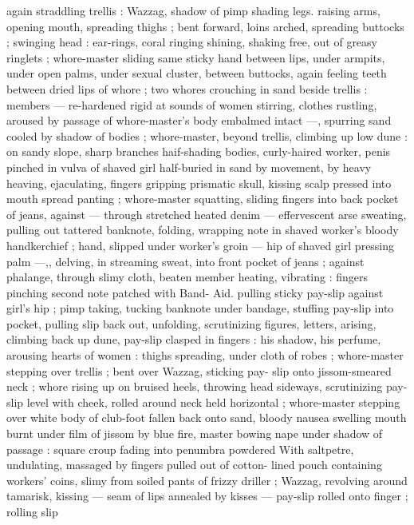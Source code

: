 {again straddling trellis : Wazzag, shadow of pimp shading legs. 
raising arms, opening mouth, spreading thighs ; bent forward, loins 
arched, spreading buttocks ; swinging head : ear-rings, coral ringing 
shining, shaking free, out of greasy ringlets ; whore-master sliding 
same sticky hand between lips, under armpits, under open palms, 
under sexual cluster, between buttocks, again feeling teeth between 
dried lips of whore ; two whores crouching in sand beside trellis : 
members --- re-hardened rigid at sounds of women stirring, clothes 
rustling, aroused by passage of whore-master's body embalmed 
intact ---, spurring sand cooled by shadow of bodies ; whore-master, 
beyond trellis, climbing up low dune : on sandy slope, sharp 
branches haif-shading bodies, curly-haired worker, penis pinched in 
vulva of shaved girl half-buried in sand by movement, by heavy 
heaving, ejaculating, fingers gripping prismatic skull, kissing scalp 
pressed into mouth spread panting ; whore-master squatting, sliding 
fingers into back pocket of jeans, against --- through stretched 
heated denim --- effervescent arse sweating, pulling out tattered 
banknote, folding, wrapping note in shaved worker's bloody 
handkerchief ; hand, slipped under worker's groin --- hip of shaved 
girl pressing palm ---,, delving, in streaming sweat, into front pocket 
of jeans ; against phalange, through slimy cloth, beaten member 
heating, vibrating : fingers pinching second note patched with Band- 
Aid. pulling sticky pay-slip against girl's hip ; pimp taking, tucking 
banknote under bandage, stuffing pay-slip into pocket, pulling slip 
back out, unfolding, scrutinizing figures, letters, arising, climbing 
back up dune, pay-slip clasped in fingers : his shadow, his perfume, 
arousing hearts of women : thighs spreading, under cloth of robes ; 
whore-master stepping over trellis ; bent over Wazzag, sticking pay- 
slip onto jissom-smeared neck ; whore rising up on bruised heels, 
throwing head sideways, scrutinizing pay-slip level with cheek, rolled 
around neck held horizontal ; whore-master stepping over white body 
of club-foot fallen back onto sand, bloody nausea swelling mouth 
burnt under film of jissom by blue fire, master bowing nape under 
shadow of passage : square croup fading into penumbra powdered 
With saltpetre, undulating, massaged by fingers pulled out of cotton- 
lined pouch containing workers' coins, slimy from soiled pants of 
frizzy driller ; Wazzag, revolving around tamarisk, kissing --- seam of 
lips annealed by kisses --- pay-slip rolled onto finger ; rolling slip 
}
